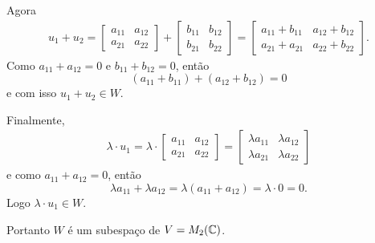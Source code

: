 \documentclass[12pt]{exam}
\begin{document}
    Agora
    \begin{align*}
        u_1 + u_2 = \begin{bmatrix}a_{11} & a_{12}\\a_{21} & a_{22}\end{bmatrix} + \begin{bmatrix}b_{11} & b_{12}\\b_{21} & b_{22}\end{bmatrix} = \begin{bmatrix}a_{11} + b_{11} & a_{12} + b_{12}\\a_{21} + a_{21} & a_{22} + b_{22}\end{bmatrix}.
    \end{align*}
    Como $a_{11} + a_{12} = 0$ e $b_{11} + b_{12} = 0$, então
    \[
        (a_{11} + b_{11}) + (a_{12} + b_{12}) = 0
    \]
    e com isso $u_1 + u_2 \in W$.

    Finalmente,
    \begin{align*}
        \lambda\cdot u_1 = \lambda \cdot \begin{bmatrix}a_{11} & a_{12}\\a_{21} & a_{22}\end{bmatrix} = \begin{bmatrix}\lambda a_{11} & \lambda a_{12}\\\lambda a_{21} & \lambda a_{22}\end{bmatrix}
    \end{align*}
    e como $a_{11} + a_{12} = 0$, então
    \[
        \lambda a_{11} + \lambda a_{12} = \lambda(a_{11} + a_{12}) = \lambda\cdot 0 = 0.
    \]
    Logo $\lambda\cdot u_1 \in W$.

    Portanto $W$ é um subespaço de $V = M_2(\mathbb{C})$.
\end{document}
